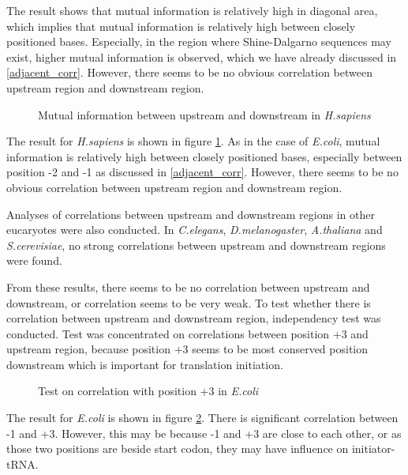 The result shows that mutual information is relatively high in diagonal
area, which implies that mutual information is relatively high between
closely positioned bases. Especially, in the region where Shine-Dalgarno
sequences may exist, higher mutual information is observed, which we
have already discussed in \ref{adjacent_corr}. However, there seems to
be no obvious correlation between upstream region and downstream region.

\begin{figure}
\begin{center}
\end{center}
\caption{Mutual information between upstream and downstream in {\it H.sapiens}}
\label{hsapud}
\end{figure}

The result for {\it H.sapiens} is shown in figure \ref{hsapud}.
As in the case of {\it E.coli}, mutual information is relatively high
between closely positioned bases, especially between position -2 and -1
as discussed in \ref{adjacent_corr}. However, there seems to be no
obvious correlation between upstream region and downstream region.

Analyses of correlations between upstream and downstream regions in
other eucaryotes were also conducted. In {\it C.elegans}, {\it
D.melanogaster}, {\it A.thaliana} and {\it S.cerevisiae}, no strong
correlations between upstream and downstream regions were found.

From these results, there seems to be no correlation between upstream
and downstream, or correlation seems to be very weak. To test whether
there is correlation between upstream and downstream region,
independency test was conducted. Test was concentrated on correlations
between position +3 and upstream region, because position +3 seems to be
most conserved position downstream which is important for translation
initiation.

\begin{figure}
\begin{center}
\end{center}
\caption{Test on correlation with position +3 in {\it E.coli}}
\label{ecoliupd}
\end{figure}

The result for {\it E.coli} is shown in figure \ref{ecoliupd}.  There
is significant correlation between -1 and +3. However, this may be
because -1 and +3 are close to each other, or as those two positions
are beside start codon, they may have influence on initiator-tRNA.

